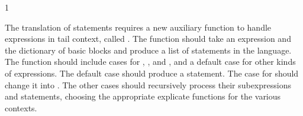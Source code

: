 \documentclass[7x10]{TimesAPriori_MIT}%
\def\pythonEd{1}
\def\edition{1}
\newcommand{\pythonColor}[0]{}
\numberwithin{theorem}{chapter}
\numberwithin{definition}{chapter}
\numberwithin{equation}{chapter}
\begin{document}
{\if\edition\pythonEd\pythonColor

The translation of  statements requires a new auxiliary
function to handle expressions in tail context, called
. The function should take an expression and the
dictionary of basic blocks and produce a list of statements in the
\LangCFun{} language.  The  function should
include cases for , , and ,
and a default case for other kinds of expressions. The default case
should produce a  statement. The case for 
should change it into .  The other cases should
recursively process their subexpressions and statements, choosing the
appropriate explicate functions for the various contexts.
  
\fi}

\newcommand{\CfunASTRacket}{
\begin{array}{lcl}
\Exp &::= & \FUNREF{\itm{label}}{\Int} \MID \CALL{\Atm}{\LP\Atm\ldots\RP} \\
\Tail &::= & \TAILCALL{\Atm}{\Atm\ldots} \\
\Def &::=& \DEF{\itm{label}}{\LP[\Var\key{:}\Type]\ldots\RP}{\Type}{\itm{info}}{\LP\LP\itm{label}\,\key{.}\,\Tail\RP\ldots\RP}
\end{array}
}

\newcommand{\CfunASTPython}{
\begin{array}{lcl}
\Exp &::= & \FUNREF{\itm{label}}{\Int} \MID \CALL{\Atm}{\Atm^{*}} \\
\Tail &::= & \TAILCALL{\Atm}{\Atm^{*}} \\
\Params &::=& \LS\LP\Var\key{,}\Type\RP\code{,}\ldots\RS \\
\Block &::=& \itm{label}\key{:} \Stmt^{*}\;\Tail \\
\Def &::=& \DEF{\itm{label}}{\Params}{\LC\Block\code{,}\ldots\RC}{\key{None}}{\Type}{\key{None}} 
\end{array}
}
\end{document}
